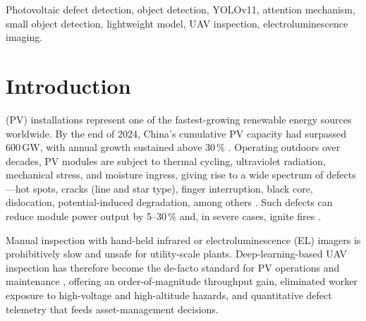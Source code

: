 \documentclass[journal,onecolumn,11pt]{IEEEtran}
\begin{document}
\begin{IEEEkeywords}
Photovoltaic defect detection, object detection, YOLOv11, attention mechanism, small object detection, lightweight model, UAV inspection, electroluminescence imaging.
\end{IEEEkeywords}

\section{Introduction}
\label{sec:intro}

 (PV) installations represent one of the fastest-growing renewable energy sources worldwide. By the end of 2024, China's cumulative PV capacity had surpassed 600\,GW, with annual growth sustained above 30\,\% \cite{nea2024report}. Operating outdoors over decades, PV modules are subject to thermal cycling, ultraviolet radiation, mechanical stress, and moisture ingress, giving rise to a wide spectrum of defects---hot spots, cracks (line and star type), finger interruption, black core, dislocation, potential-induced degradation, among others \cite{kontges2014review}. Such defects can reduce module power output by 5--30\,\% and, in severe cases, ignite fires \cite{aghaei2022review}.

Manual inspection with hand-held infrared or electroluminescence (EL) imagers is prohibitively slow and unsafe for utility-scale plants. Deep-learning-based UAV inspection has therefore become the de-facto standard for PV operations and maintenance \cite{pierdicca2018deep}, offering an order-of-magnitude throughput gain, eliminated worker exposure to high-voltage and high-altitude hazards, and quantitative defect telemetry that feeds asset-management decisions.
\end{document}

